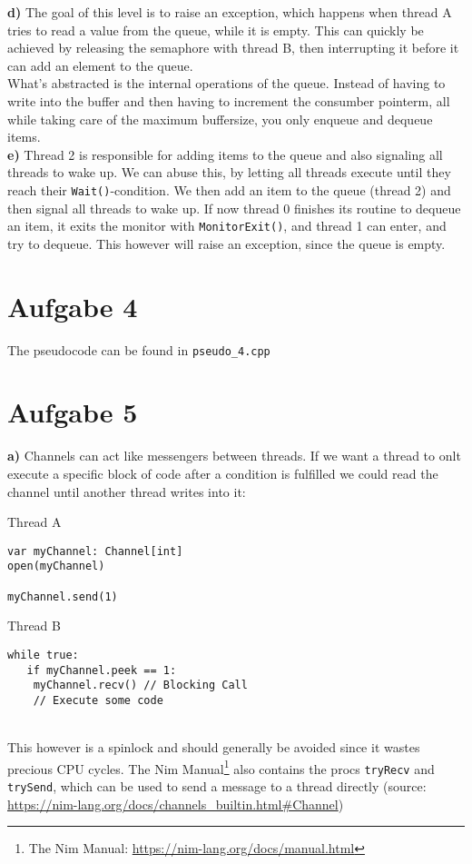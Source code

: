 \documentclass{article}
\begin{document}
\textbf{d)} The goal of this level is to raise an exception, which happens
when thread A tries to read a value from the queue, while it is empty.
This can quickly be achieved by releasing the semaphore with thread B,
then interrupting it before it can add an element to the queue.\\
What's abstracted is the internal operations of the queue.
Instead of having to write into the buffer and then having to increment
the consumber pointerm, all while taking care of the maximum
buffersize, you only enqueue and dequeue items.\\

\textbf{e)} Thread 2 is responsible for adding items to the queue and
also signaling all threads to wake up. We can abuse this, by letting all
threads execute until they reach their \texttt{Wait()}-condition. We then
add an item to the queue (thread 2) and then signal all threads to wake up.
If now thread 0 finishes its routine to dequeue an item, it exits the
monitor with \texttt{MonitorExit()}, and thread 1 can enter, and try
to dequeue. This however will raise an exception, since the queue is empty.

\section*{Aufgabe 4}
The pseudocode can be found in \texttt{pseudo\_4.cpp}

\section*{Aufgabe 5}
\textbf{a)} Channels can act like messengers between threads. If we want a thread
to onlt execute a specific block of code after a condition is fulfilled we could
read the channel until another thread writes into it: \\
\begin{minipage}{.39\textwidth}
    Thread A
\begin{lstlisting}
var myChannel: Channel[int]
open(myChannel)

myChannel.send(1)
\end{lstlisting}
\end{minipage}
\begin{minipage}{.59\textwidth}
    Thread B
\begin{lstlisting}
while true: 
   if myChannel.peek == 1:
	myChannel.recv() // Blocking Call
	// Execute some code 
\end{lstlisting}
\end{minipage} \\
This however is a spinlock and should generally be avoided since it wastes precious
CPU cycles. The Nim Manual\footnote{The Nim Manual:
    \url{https://nim-lang.org/docs/manual.html}} also contains the procs
\texttt{tryRecv} and \texttt{trySend}, which can be used to send a message to
a thread directly (source: \url{https://nim-lang.org/docs/channels_builtin.html#Channel})\\
\end{document}
